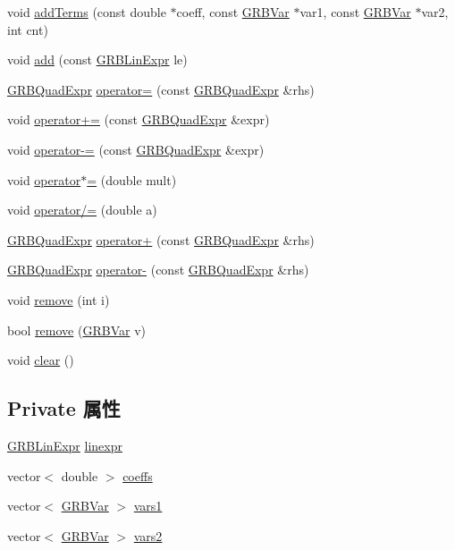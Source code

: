 \begin{DoxyCompactItemize}
void \hyperlink{classGRBQuadExpr_a0c409ad1da9b6f4aa96223344e21d4aa}{add\+Terms} (const double $\ast$coeff, const \hyperlink{classGRBVar}{G\+R\+B\+Var} $\ast$var1, const \hyperlink{classGRBVar}{G\+R\+B\+Var} $\ast$var2, int cnt)
\item 
void \hyperlink{classGRBQuadExpr_a2110c8afc03887b079cee94bb118ed5b}{add} (const \hyperlink{classGRBLinExpr}{G\+R\+B\+Lin\+Expr} le)
\item 
\hyperlink{classGRBQuadExpr}{G\+R\+B\+Quad\+Expr} \hyperlink{classGRBQuadExpr_a23c661bee78a6710e0cf0d0c81fb49b1}{operator=} (const \hyperlink{classGRBQuadExpr}{G\+R\+B\+Quad\+Expr} \&rhs)
\item 
void \hyperlink{classGRBQuadExpr_a1953215e8ddf053f6be72483bae1b795}{operator+=} (const \hyperlink{classGRBQuadExpr}{G\+R\+B\+Quad\+Expr} \&expr)
\item 
void \hyperlink{classGRBQuadExpr_a1fb9651a3653b70fd17682fe70b4fe7f}{operator-\/=} (const \hyperlink{classGRBQuadExpr}{G\+R\+B\+Quad\+Expr} \&expr)
\item 
void \hyperlink{classGRBQuadExpr_aebe85e0385f8770d3324e1b9ba6d8301}{operator$\ast$=} (double mult)
\item 
void \hyperlink{classGRBQuadExpr_a20c235f27fe3abfa7ed64b5f30864c80}{operator/=} (double a)
\item 
\hyperlink{classGRBQuadExpr}{G\+R\+B\+Quad\+Expr} \hyperlink{classGRBQuadExpr_a2ccc50627ecaa66a10963aed9e666f38}{operator+} (const \hyperlink{classGRBQuadExpr}{G\+R\+B\+Quad\+Expr} \&rhs)
\item 
\hyperlink{classGRBQuadExpr}{G\+R\+B\+Quad\+Expr} \hyperlink{classGRBQuadExpr_a47a14ad704161d27c0bbaf939ccbfe52}{operator-\/} (const \hyperlink{classGRBQuadExpr}{G\+R\+B\+Quad\+Expr} \&rhs)
\item 
void \hyperlink{classGRBQuadExpr_adf78f93dfa684779f589e4a7f955dd30}{remove} (int i)
\item 
bool \hyperlink{classGRBQuadExpr_adb5762320abe8033eb91ae7f764c5f51}{remove} (\hyperlink{classGRBVar}{G\+R\+B\+Var} v)
\item 
void \hyperlink{classGRBQuadExpr_a1ab3de2a1d0b102c2df9f79a2587b043}{clear} ()
\end{DoxyCompactItemize}
\subsection*{Private 属性}
\begin{DoxyCompactItemize}
\item 
\hyperlink{classGRBLinExpr}{G\+R\+B\+Lin\+Expr} \hyperlink{classGRBQuadExpr_a64271f5613f18c638c5151135924a5c4}{linexpr}
\item 
vector$<$ double $>$ \hyperlink{classGRBQuadExpr_ad76d7cc3a36808156873d166da9383bd}{coeffs}
\item 
vector$<$ \hyperlink{classGRBVar}{G\+R\+B\+Var} $>$ \hyperlink{classGRBQuadExpr_a37c9db4ad0b8f77e99e9305e52f9f44c}{vars1}
\item 
vector$<$ \hyperlink{classGRBVar}{G\+R\+B\+Var} $>$ \hyperlink{classGRBQuadExpr_a3a8446260dbb63555ab6bc4bf9e2fd1d}{vars2}
\end{DoxyCompactItemize}
